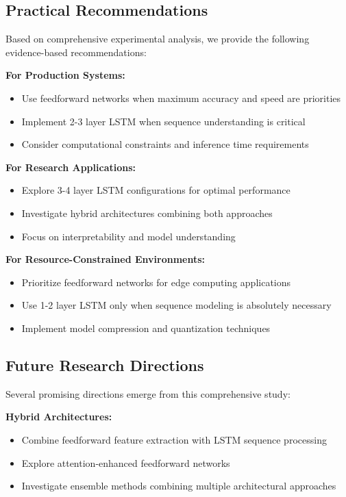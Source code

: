 \documentclass[a4paper, journal]{IEEEtran}
\begin{document}
\subsection{Practical Recommendations}

Based on comprehensive experimental analysis, we provide the following evidence-based recommendations:

\textbf{For Production Systems:}
\begin{itemize}
    \item Use feedforward networks when maximum accuracy and speed are priorities
    \item Implement 2-3 layer LSTM when sequence understanding is critical
    \item Consider computational constraints and inference time requirements
\end{itemize}

\textbf{For Research Applications:}
\begin{itemize}
    \item Explore 3-4 layer LSTM configurations for optimal performance
    \item Investigate hybrid architectures combining both approaches
    \item Focus on interpretability and model understanding
\end{itemize}

\textbf{For Resource-Constrained Environments:}
\begin{itemize}
    \item Prioritize feedforward networks for edge computing applications
    \item Use 1-2 layer LSTM only when sequence modeling is absolutely necessary
    \item Implement model compression and quantization techniques
\end{itemize}

\subsection{Future Research Directions}

Several promising directions emerge from this comprehensive study:

\textbf{Hybrid Architectures:}
\begin{itemize}
    \item Combine feedforward feature extraction with LSTM sequence processing
    \item Explore attention-enhanced feedforward networks
    \item Investigate ensemble methods combining multiple architectural approaches
\end{itemize}
\end{document}
